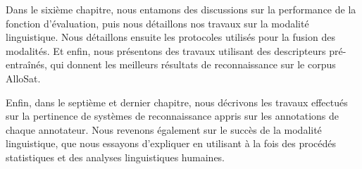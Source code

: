 Dans le sixième chapitre, nous entamons des discussions sur la performance de la fonction d'évaluation, puis nous détaillons nos travaux sur la modalité linguistique. Nous détaillons ensuite les protocoles utilisés pour la fusion des modalités. Et enfin, nous présentons des travaux utilisant des descripteurs pré-entraînés, qui donnent les meilleurs résultats de reconnaissance sur le corpus AlloSat.

Enfin, dans le septième et dernier chapitre, nous décrivons les travaux effectués sur la pertinence de systèmes de reconnaissance appris sur les annotations de chaque annotateur. Nous revenons également sur le succès de la modalité linguistique, que nous essayons d'expliquer en utilisant à la fois des procédés statistiques et des analyses linguistiques humaines.
